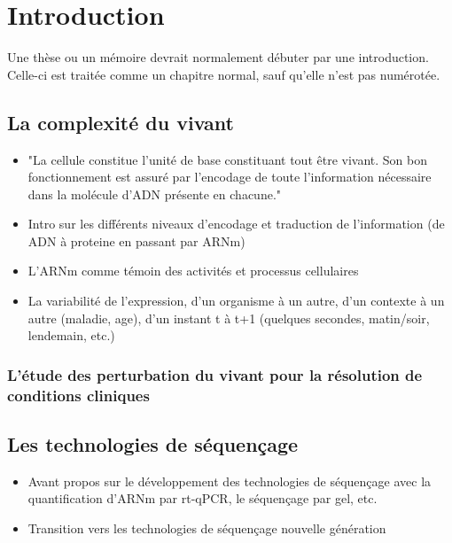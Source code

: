 \setcounter{chapter}{1}         %
\chapter*{Introduction}         %

Une thèse ou un mémoire devrait normalement débuter par une
introduction. Celle-ci est traitée comme un chapitre normal, sauf
qu'elle n'est pas numérotée.

\section{La complexité du vivant}
\begin{itemize}
\item "La cellule constitue l'unité de base constituant tout être vivant. Son bon fonctionnement est assuré par l'encodage de toute l'information nécessaire dans la molécule d'ADN présente en chacune."
\item Intro sur les différents niveaux d'encodage et traduction de l'information (de ADN à proteine en passant par ARNm)
\item L'ARNm comme témoin des activités et processus cellulaires
\item La variabilité de l'expression, d'un organisme à un autre, d'un contexte à un autre (maladie, age), d'un instant t à t+1 (quelques secondes, matin/soir, lendemain, etc.)
\end{itemize}

\subsection{L'étude des perturbation du vivant pour la résolution de conditions cliniques}

\section{Les technologies de séquençage}
\begin{itemize}
\item Avant propos sur le développement des technologies de séquençage avec la quantification d'ARNm par rt-qPCR, le séquençage par gel, etc.
\item Transition vers les technologies de séquençage nouvelle génération
\end{itemize}

